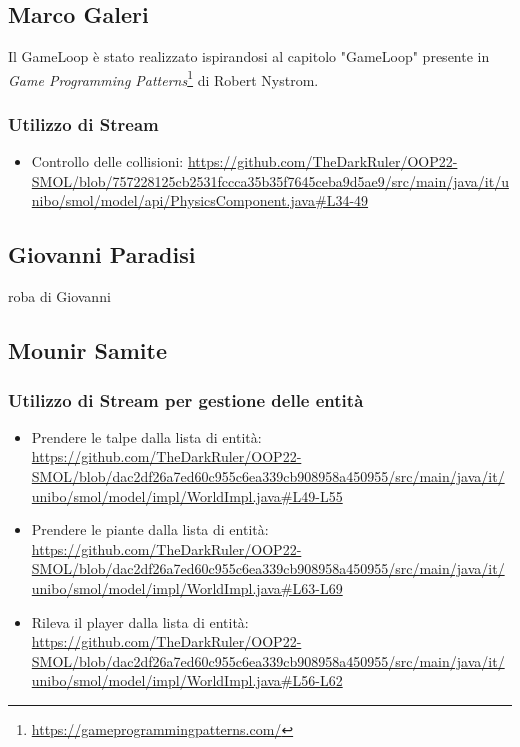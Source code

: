 \documentclass[a4paper,12pt]{report}
\begin{document}
\subsection*{Marco Galeri}

Il GameLoop è stato realizzato ispirandosi al capitolo "GameLoop" presente in \emph{Game Programming Patterns}\footnote{\url{https://gameprogrammingpatterns.com/}} di Robert Nystrom.

\subsubsection{Utilizzo di Stream}
\begin{itemize}
    \item Controllo delle collisioni: \url{https://github.com/TheDarkRuler/OOP22-SMOL/blob/757228125cb2531fccca35b35f7645ceba9d5ae9/src/main/java/it/unibo/smol/model/api/PhysicsComponent.java#L34-49}

\end{itemize}

\subsection*{Giovanni Paradisi}
roba di Giovanni
\subsection*{Mounir Samite}
\subsubsection*{Utilizzo di Stream per gestione delle entità}
\begin{itemize}
    \item Prendere le talpe dalla lista di entità: \url{https://github.com/TheDarkRuler/OOP22-SMOL/blob/dac2df26a7ed60c955c6ea339cb908958a450955/src/main/java/it/unibo/smol/model/impl/WorldImpl.java#L49-L55}
    \item Prendere le piante dalla lista di entità: \url{https://github.com/TheDarkRuler/OOP22-SMOL/blob/dac2df26a7ed60c955c6ea339cb908958a450955/src/main/java/it/unibo/smol/model/impl/WorldImpl.java#L63-L69}
    \item Rileva il player dalla lista di entità: \url{https://github.com/TheDarkRuler/OOP22-SMOL/blob/dac2df26a7ed60c955c6ea339cb908958a450955/src/main/java/it/unibo/smol/model/impl/WorldImpl.java#L56-L62}
\end{itemize}
\end{document}
